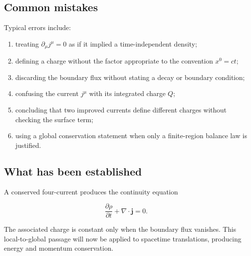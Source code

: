 \subsection{Common mistakes}

Typical errors include:

\begin{enumerate}
    \item treating \(\partial_{\mu}j^{\mu}=0\) as if it implied a time-independent density;
    \item defining a charge without the factor appropriate to the convention \(x^{0}=ct\);
    \item discarding the boundary flux without stating a decay or boundary condition;
    \item confusing the current \(j^{\mu}\) with its integrated charge \(Q\);
    \item concluding that two improved currents define different charges without checking the surface term;
    \item using a global conservation statement when only a finite-region balance law is justified.
\end{enumerate}

\subsection{What has been established}

A conserved four-current produces the continuity equation

\[
\frac{\partial\rho}{\partial t}
+
\nabla\cdot\mathbf{j}
=
0.
\]

The associated charge is constant only when the boundary flux vanishes. This local-to-global passage will now be applied to spacetime translations, producing energy and momentum conservation.
